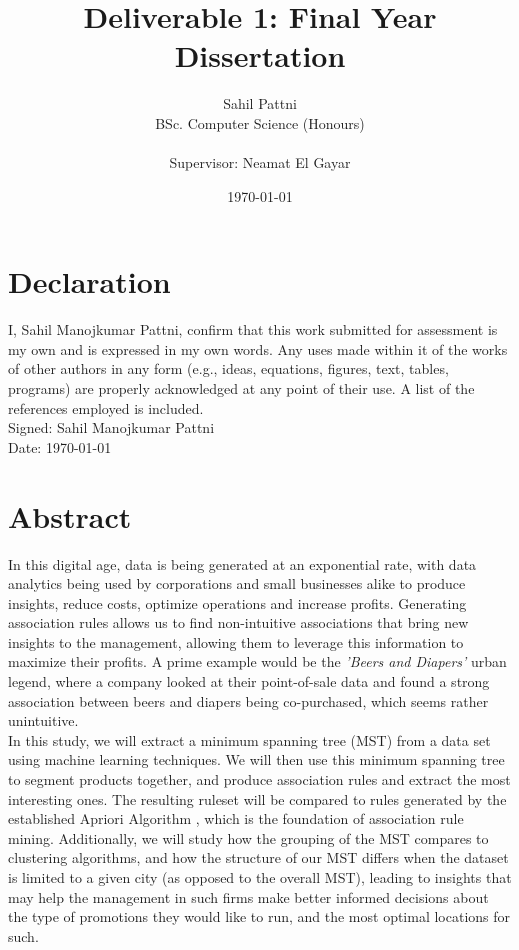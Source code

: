 \documentclass[a4paper,11pt]{article}
\begin{document}
\title{Deliverable 1: Final Year Dissertation}
\author{
	Sahil Pattni\\ 
	BSc. Computer Science (Honours)\\\\
	Supervisor: Neamat El Gayar
	}
\date{\today}
\maketitle
{}

\section*{Declaration} 
I, Sahil Manojkumar Pattni, confirm that this work submitted for assessment is my own and is expressed in my own words. Any uses made within it of the works of other authors in any form (e.g., ideas, equations, figures, text, tables, programs) are properly acknowledged at any point of their use. A list of the references employed is included. 
\\
Signed: Sahil Manojkumar Pattni\\
Date: \today
\newpage
\section*{Abstract}
In this digital age, data is being generated at an exponential rate, with data analytics being used by corporations and small businesses alike to produce insights, reduce costs, optimize operations and increase profits.  Generating association rules allows us to find non-intuitive associations that bring new insights to the management, allowing them to leverage this information to maximize their profits. A prime example would be the \textit{'Beers and Diapers'} urban legend, where a company looked at their point-of-sale data and found a strong association between beers and diapers being co-purchased, which seems rather unintuitive.\\
In this study, we will extract a minimum spanning tree (MST) from a data set using machine learning techniques. We will then use this minimum spanning tree to segment products together,  and produce association rules and extract the most interesting ones. The resulting ruleset will be compared to rules generated by the established Apriori Algorithm \cite{apriori}, which is the foundation of association rule mining.  Additionally, we will study how the grouping of the MST compares to clustering algorithms, and how the structure of our MST differs when the dataset is limited to a given city (as opposed to the overall MST), leading to insights that may help the management in such firms make better informed decisions about the type of promotions they would like to run, and the most optimal locations for such.
\end{document}
